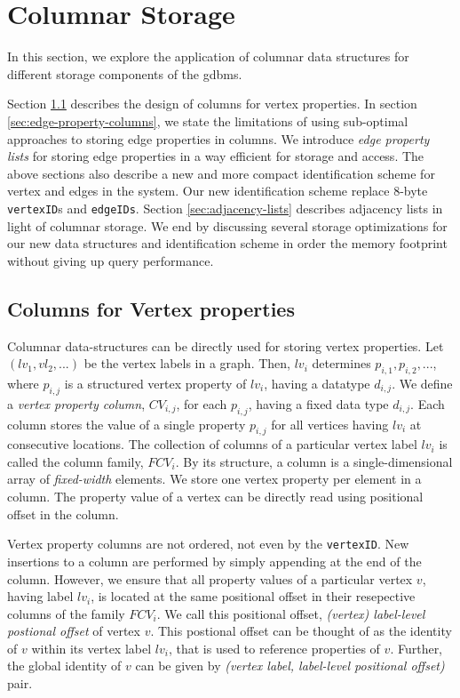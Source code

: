 \chapter{Columnar Storage}
\label{c:columnar-storage}

In this section, we explore the application of columnar data structures for different storage components of the \gls{gdbms}. 

Section \ref{sec:vertex-property-columns} describes the design of columns for vertex properties. In section \ref{sec:edge-property-columns}, we state the limitations of using sub-optimal approaches to storing edge properties in columns. We introduce \emph{edge property lists} for storing edge properties in a way efficient for storage and access. The above sections also describe a new and more compact identification scheme for vertex and edges in the system. Our new identification scheme replace 8-byte \texttt{vertexID}s and \texttt{edgeIDs}. Section \ref{sec:adjacency-lists} describes adjacency lists in light of columnar storage. We end by discussing several storage optimizations for our new data structures and identification scheme in order the memory footprint without giving up query performance.

\section{Columns for Vertex properties}
\label{sec:vertex-property-columns}

Columnar data-structures can be directly used for storing vertex properties. Let $(lv_1, vl_2, ...)$ be the vertex labels in a graph. Then, $lv_i$ determines $p_{i,1},  p_{i,2}, ...$, where $p_{i, j}$ is a structured vertex property of $lv_i$, having a datatype $d_{i,j}$. We define a \emph{vertex property column}, $CV_{i,j}$, for each $p_{i,j}$, having a fixed data type $d_{i,j}$. Each column stores the value of a single property $p_{i,j}$ for all vertices having $lv_i$ at consecutive locations. The collection of columns of a particular vertex label $lv_i$ is called the column family, $FCV_i$. By its structure, a column is a single-dimensional array of \emph{fixed-width} elements. We store one vertex property per element in a column. The property value of a vertex can be directly read using positional offset in the column.

Vertex property columns are not ordered, not even by the \texttt{vertexID}. New insertions to a column are performed by simply appending at the end of the column. However, we ensure that all property values of a particular vertex $v$, having label $lv_i$, is located at the same positional offset in their resepective columns of the family $FCV_i$. We call this positional offset, \emph{(vertex) label-level postional offset} of vertex $v$. This postional offset can be thought of as the identity of $v$ within its vertex label $lv_i$, that is used to reference properties of $v$. Further, the global identity of $v$ can be given by \textit{(vertex label, label-level positional offset)} pair.

